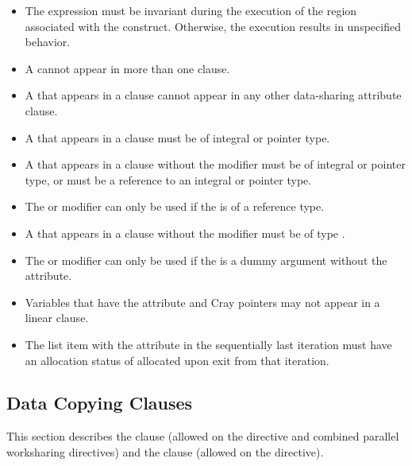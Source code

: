 \restrictions
\begin{itemize}
\item The  expression must be invariant during the execution of the region 
associated with the construct. Otherwise, the execution results in unspecified 
behavior.

\item A  cannot appear in more than one  clause.

\item A  that appears in a  clause cannot appear in any other data-sharing 
attribute clause. 

\cspecificstart
\item A  that appears in a  clause must be of integral or pointer type.
\cspecificend

\cppspecificstart
\item A  that appears in a  clause without the  modifier must be of integral or pointer type, or must be a reference to an integral or pointer type. 
\item The  or  modifier can only be used if the  is of a reference type.
\cppspecificend

\fortranspecificstart
\item A  that appears in a  clause without the  modifier must be of type .
\item The  or  modifier can only be used if the  is a dummy argument without the  attribute.
\item Variables that have the  attribute and Cray pointers may not appear in a linear clause. 
\item The list item with the  attribute in the sequentially last iteration must have an allocation status of allocated upon exit from that iteration. 
\fortranspecificend
\end{itemize}










\subsection{Data Copying Clauses}
\label{subsec:Data Copying Clauses}
This section describes the  clause (allowed on the  directive and 
combined parallel worksharing directives) and the  clause (allowed on 
the  directive).

